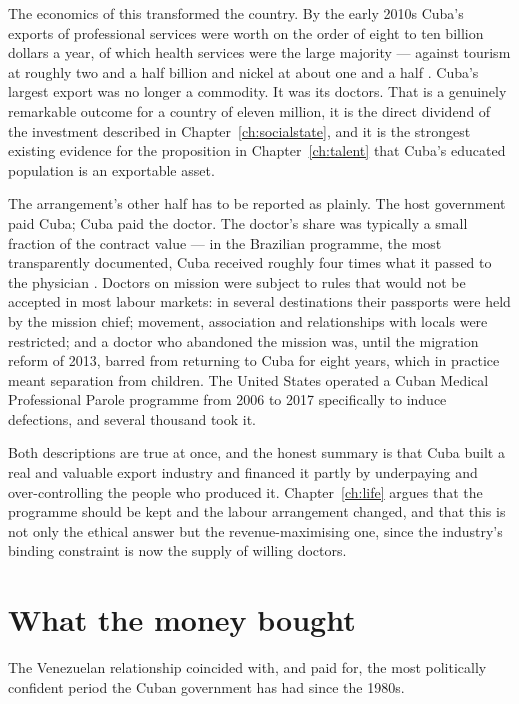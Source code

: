 The economics of this transformed the country. By the early 2010s Cuba's
exports of professional services were worth on the order of eight to ten billion
dollars a year, of which health services were the large majority --- against
tourism at roughly two and a half billion and nickel at about one and a
half \citep{onei,mesalago2013}.\unv{} Cuba's largest export was no longer a commodity. It was its
doctors. That is a genuinely remarkable outcome for a country of eleven
million, it is the direct dividend of the investment described in
Chapter~\ref{ch:socialstate}, and it is the strongest existing evidence for the
proposition in Chapter~\ref{ch:talent} that Cuba's educated population is an
exportable asset.

The arrangement's other half has to be reported as plainly. The host government
paid Cuba; Cuba paid the doctor. The doctor's share was typically a small
fraction of the contract value --- in the Brazilian programme, the most
transparently documented, Cuba received roughly four times what it passed to the
physician \citep{kirk2015}.\unv{} Doctors on mission were subject to rules that would not be
accepted in most labour markets: in several destinations their passports were
held by the mission chief; movement, association and relationships with locals
were restricted; and a doctor who abandoned the mission was, until the
migration reform of 2013, barred from returning to Cuba for eight years, which
in practice meant separation from children. The United States operated a Cuban
Medical Professional Parole programme from 2006 to 2017 specifically to induce
defections, and several thousand took it.

Both descriptions are true at once, and the honest summary is that Cuba built a
real and valuable export industry and financed it partly by underpaying and
over-controlling the people who produced it. Chapter~\ref{ch:life} argues that
the programme should be kept and the labour arrangement changed, and that this
is not only the ethical answer but the revenue-maximising one, since the
industry's binding constraint is now the supply of willing doctors.

\section{What the money bought}

The Venezuelan relationship coincided with, and paid for, the most politically
confident period the Cuban government has had since the 1980s.


